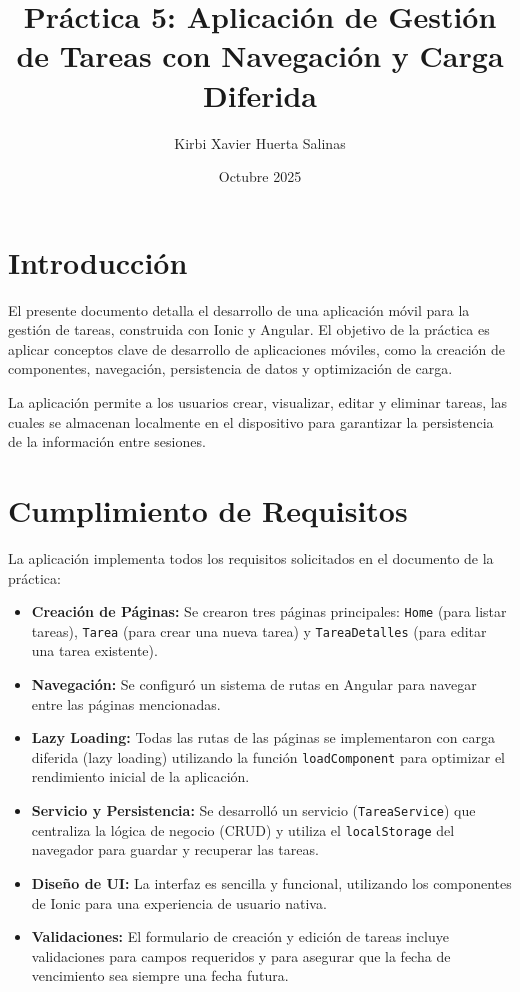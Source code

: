 \documentclass{article}
\title{Práctica 5: Aplicación de Gestión de Tareas con Navegación y Carga Diferida}
\author{Kirbi Xavier Huerta Salinas}
\date{Octubre 2025}
\begin{document}
\maketitle

\section{Introducción}
El presente documento detalla el desarrollo de una aplicación móvil para la gestión de tareas, construida con Ionic y Angular. El objetivo de la práctica es aplicar conceptos clave de desarrollo de aplicaciones móviles, como la creación de componentes, navegación, persistencia de datos y optimización de carga.

La aplicación permite a los usuarios crear, visualizar, editar y eliminar tareas, las cuales se almacenan localmente en el dispositivo para garantizar la persistencia de la información entre sesiones.

\section{Cumplimiento de Requisitos}
La aplicación implementa todos los requisitos solicitados en el documento de la práctica:
\begin{itemize}
    \item \textbf{Creación de Páginas:} Se crearon tres páginas principales: \texttt{Home} (para listar tareas), \texttt{Tarea} (para crear una nueva tarea) y \texttt{TareaDetalles} (para editar una tarea existente).
    \item \textbf{Navegación:} Se configuró un sistema de rutas en Angular para navegar entre las páginas mencionadas.
    \item \textbf{Lazy Loading:} Todas las rutas de las páginas se implementaron con carga diferida (lazy loading) utilizando la función \texttt{loadComponent} para optimizar el rendimiento inicial de la aplicación.
    \item \textbf{Servicio y Persistencia:} Se desarrolló un servicio (\texttt{TareaService}) que centraliza la lógica de negocio (CRUD) y utiliza el \texttt{localStorage} del navegador para guardar y recuperar las tareas.
    \item \textbf{Diseño de UI:} La interfaz es sencilla y funcional, utilizando los componentes de Ionic para una experiencia de usuario nativa.
    \item \textbf{Validaciones:} El formulario de creación y edición de tareas incluye validaciones para campos requeridos y para asegurar que la fecha de vencimiento sea siempre una fecha futura.
\end{itemize}
\end{document}
